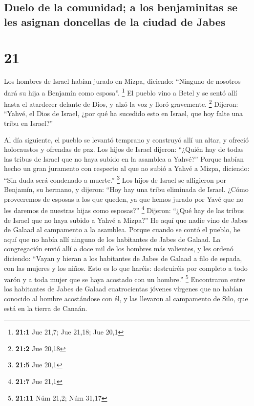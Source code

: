 \hypertarget{duelo-de-la-comunidad-a-los-benjaminitas-se-les-asignan-doncellas-de-la-ciudad-de-jabes}{%
\subsection{Duelo de la comunidad; a los benjaminitas se les asignan
doncellas de la ciudad de
Jabes}\label{duelo-de-la-comunidad-a-los-benjaminitas-se-les-asignan-doncellas-de-la-ciudad-de-jabes}}

\hypertarget{section-20}{%
\section{21}\label{section-20}}

 Los hombres de Israel habían jurado en Mizpa, diciendo:
``Ninguno de nosotros dará su hija a Benjamín como esposa''. \footnote{\textbf{21:1}
  Jue 21,7; Jue 21,18; Jue 20,1}  El pueblo vino a Betel y
se sentó allí hasta el atardecer delante de Dios, y alzó la voz y lloró
gravemente. \footnote{\textbf{21:2} Jue 20,18}  Dijeron:
``Yahvé, el Dios de Israel, ¿por qué ha sucedido esto en Israel, que hoy
falte una tribu en Israel?''

 Al día siguiente, el pueblo se levantó temprano y
construyó allí un altar, y ofreció holocaustos y ofrendas de paz.
 Los hijos de Israel dijeron: ``¿Quién hay de todas las
tribus de Israel que no haya subido en la asamblea a Yahvé?'' Porque
habían hecho un gran juramento con respecto al que no subió a Yahvé a
Mizpa, diciendo: ``Sin duda será condenado a muerte.'' \footnote{\textbf{21:5}
  Jue 20,1}  Los hijos de Israel se afligieron por
Benjamín, su hermano, y dijeron: ``Hoy hay una tribu eliminada de
Israel.  ¿Cómo proveeremos de esposas a los que queden, ya
que hemos jurado por Yavé que no les daremos de nuestras hijas como
esposas?'' \footnote{\textbf{21:7} Jue 21,1}  Dijeron:
``¿Qué hay de las tribus de Israel que no haya subido a Yahvé a Mizpa?''
He aquí que nadie vino de Jabes de Galaad al campamento a la asamblea.
 Porque cuando se contó el pueblo, he aquí que no había
allí ninguno de los habitantes de Jabes de Galaad.  La
congregación envió allí a doce mil de los hombres más valientes, y les
ordenó diciendo: ``Vayan y hieran a los habitantes de Jabes de Galaad a
filo de espada, con las mujeres y los niños.  Esto es lo
que haréis: destruiréis por completo a todo varón y a toda mujer que se
haya acostado con un hombre.'' \footnote{\textbf{21:11} Núm 21,2; Núm
  31,17}  Encontraron entre los habitantes de Jabes de
Galaad cuatrocientas jóvenes vírgenes que no habían conocido al hombre
acostándose con él, y las llevaron al campamento de Silo, que está en la
tierra de Canaán.


